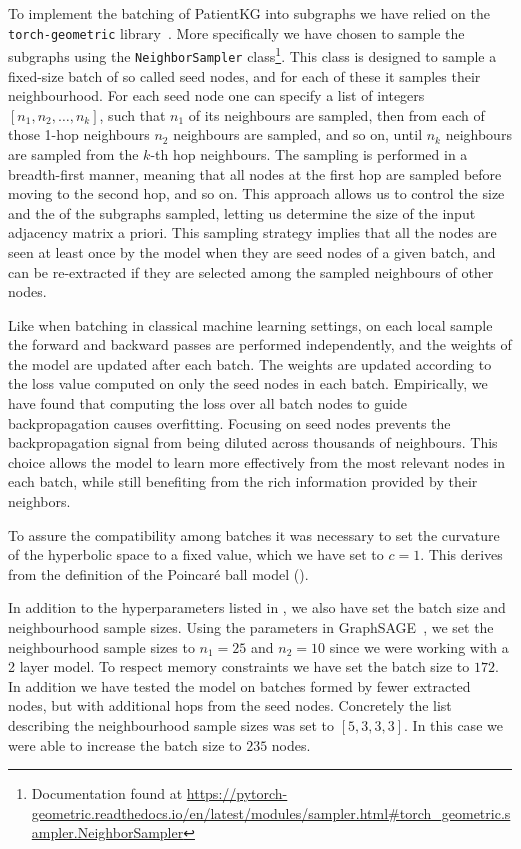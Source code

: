 To implement the batching of PatientKG into subgraphs we have relied on the \texttt{torch-geometric} library~\cite{fey2019pytorchGeometric}. More specifically we have chosen to sample the subgraphs using the \texttt{NeighborSampler} class\footnote{Documentation found at \url{https://pytorch-geometric.readthedocs.io/en/latest/modules/sampler.html\#torch\_geometric.sampler.NeighborSampler}}. This class is designed to sample a fixed-size batch of so called seed nodes, and for each of these it samples their neighbourhood. For each seed node one can specify a list of integers $[n_1, n_2, \dots, n_k]$, such that $n_1$ of its neighbours are sampled, then from each of those 1-hop neighbours $n_2$ neighbours are sampled, and so on, until $n_k$ neighbours are sampled from the $k$-th hop neighbours. The sampling is performed in a breadth-first manner, meaning that all nodes at the first hop are sampled before moving to the second hop, and so on. This approach allows us to control the size and the of the subgraphs sampled, letting us determine the size of the input adjacency matrix a priori. This sampling strategy implies that all the nodes are seen at least once by the model when they are seed nodes of a given batch, and can be re-extracted if they are selected among the sampled neighbours of other nodes. 

Like when batching in classical machine learning settings, on each local sample the forward and backward passes are performed independently, and the weights of the model are updated after each batch. The weights are updated according to the loss value computed on only the seed nodes in each batch. Empirically, we have found that computing the loss over all batch nodes to guide backpropagation causes overfitting. Focusing on seed nodes prevents the backpropagation signal from being diluted across thousands of neighbours. This choice allows the model to learn more effectively from the most relevant nodes in each batch, while still benefiting from the rich information provided by their neighbors.

To assure the compatibility among batches it was necessary to set the curvature of the hyperbolic space to a fixed value, which we have set to $c=1$. This derives from the definition of the Poincaré ball model ().

\medskip 

In addition to the hyperparameters listed in , we also have set the batch size and neighbourhood sample sizes. Using the parameters in GraphSAGE~\cite{Hamilton2017inductiveRepresentationLearning}, we set the neighbourhood sample sizes to $n_1=25$ and $n_2=10$ since we were working with a 2 layer model. To respect memory constraints we have set the batch size to $172$. In addition we have tested the model on batches formed by fewer extracted nodes, but with additional hops from the seed nodes. Concretely the list describing the neighbourhood sample sizes was set to $[5,3,3,3]$. In this case we were able to increase the batch size to $235$ nodes.

